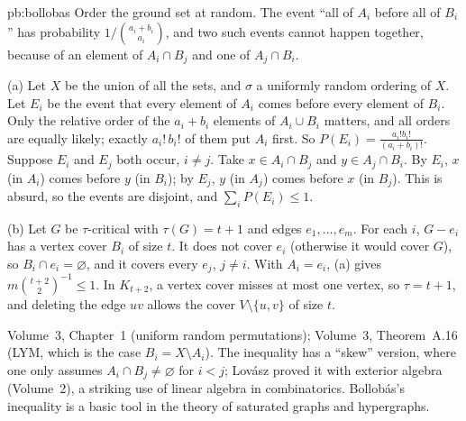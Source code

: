 \begin{solution}{pb:bollobas}
\idea Order the ground set at random. The event ``all of $A_i$ before all of $B_i$'' has probability $1/\binom{a_i+b_i}{a_i}$, and two such
events cannot happen together, because of an element of $A_i\cap B_j$ and one of $A_j\cap B_i$.

\writeup (a) Let $X$ be the union of all the sets, and $\sigma$ a uniformly random ordering of $X$. Let $E_i$ be the event that every element
of $A_i$ comes before every element of $B_i$. Only the relative order of the $a_i+b_i$ elements of $A_i\cup B_i$ matters, and all orders
are equally likely; exactly $a_i!\,b_i!$ of them put $A_i$ first. So $P(E_i)=\frac{a_i!b_i!}{(a_i+b_i)!}$. Suppose $E_i$ and $E_j$ both occur, $i\ne j$.
Take $x\in A_i\cap B_j$ and $y\in A_j\cap B_i$. By $E_i$, $x$ (in $A_i$) comes before $y$ (in $B_i$); by $E_j$, $y$ (in $A_j$) comes before $x$ (in
$B_j$). This is absurd, so the events are disjoint, and $\sum_iP(E_i)\le1$.

(b) Let $G$ be $\tau$-critical with $\tau(G)=t+1$ and edges $e_1,\dots,e_m$. For each $i$, $G-e_i$ has a vertex cover $B_i$ of size $t$. It
does not cover $e_i$ (otherwise it would cover $G$), so $B_i\cap e_i=\varnothing$, and it covers every $e_j$, $j\ne i$. With $A_i=e_i$, (a) gives
$m\binom{t+2}2^{-1}\le1$. In $K_{t+2}$, a vertex cover misses at most one vertex, so $\tau=t+1$, and deleting the edge $uv$ allows the cover
$V\setminus\{u,v\}$ of size $t$.

\tools Volume~3, Chapter~1 (uniform random permutations); Volume~3, Theorem~A.16 (LYM, which is the case $B_i=X\setminus A_i$).
\leads The inequality has a ``skew'' version, where one only assumes $A_i\cap B_j\ne\varnothing$ for $i<j$; Lovász proved it with exterior
algebra (Volume~2), a striking use of linear algebra in combinatorics. Bollobás's inequality is a basic tool in the theory of
saturated graphs and hypergraphs.
\end{solution}

